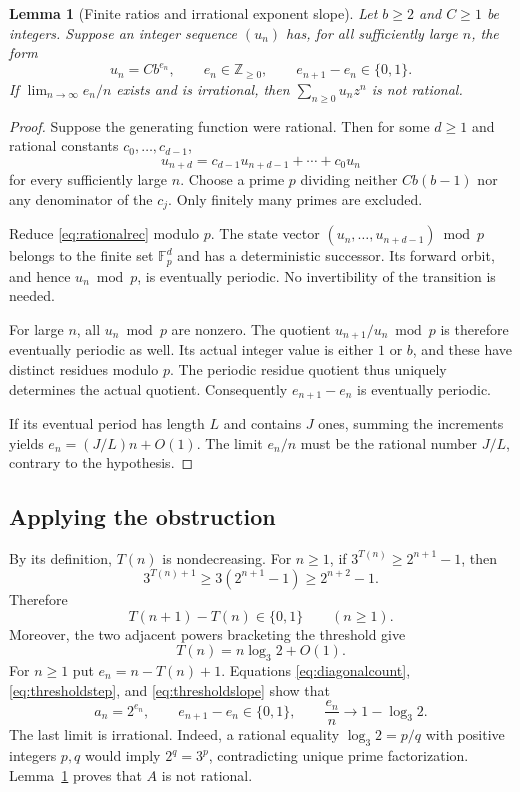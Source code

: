 \documentclass[11pt,letterpaper]{article}
\numberwithin{equation}{section}
\newtheorem{lemma}[theorem]{Lemma}
\theoremstyle{definition}
\theoremstyle{remark}
\newcommand{\Z}{\mathbb{Z}}
\newcommand{\F}{\mathbb{F}}
\begin{document}
\begin{lemma}[Finite ratios and irrational exponent slope]\label{lem:finitefield}
Let $b\ge2$ and $C\ge1$ be integers. Suppose an integer sequence $(u_n)$
has, for all sufficiently large $n$, the form
\[
 u_n=C b^{e_n},\qquad e_n\in\Z_{\ge0},\qquad e_{n+1}-e_n\in\{0,1\}.
\]
If $\lim_{n\to\infty}e_n/n$ exists and is irrational, then
$\sum_{n\ge0}u_nz^n$ is not rational.
\end{lemma}
\begin{proof}
Suppose the generating function were rational. Then for some $d\ge1$
and rational constants $c_0,\ldots,c_{d-1}$,
\begin{equation}\label{eq:rationalrec}
 u_{n+d}=c_{d-1}u_{n+d-1}+\cdots+c_0u_n
\end{equation}
for every sufficiently large $n$. Choose a prime $p$ dividing neither
$Cb(b-1)$ nor any denominator of the $c_j$. Only finitely many primes
are excluded.

Reduce \eqref{eq:rationalrec} modulo $p$. The state vector
$(u_n,\ldots,u_{n+d-1})\bmod p$ belongs to the finite set $\F_p^d$ and
has a deterministic successor. Its forward orbit, and hence $u_n\bmod p$,
is eventually periodic. No invertibility of the transition is needed.

For large $n$, all $u_n\bmod p$ are nonzero. The quotient
$u_{n+1}/u_n\bmod p$ is therefore eventually periodic as well. Its actual
integer value is either $1$ or $b$, and these have distinct residues modulo
$p$. The periodic residue quotient thus uniquely determines the actual
quotient. Consequently $e_{n+1}-e_n$ is eventually periodic.

If its eventual period has length $L$ and contains $J$ ones, summing the
increments yields $e_n=(J/L)n+O(1)$. The limit $e_n/n$ must be the rational
number $J/L$, contrary to the hypothesis.
\end{proof}

\subsection{Applying the obstruction}
By its definition, $T(n)$ is nondecreasing. For $n\ge1$, if
$3^{T(n)}\ge2^{n+1}-1$, then
\[
 3^{T(n)+1}\ge3(2^{n+1}-1)\ge2^{n+2}-1.
\]
Therefore
\begin{equation}\label{eq:thresholdstep}
 T(n+1)-T(n)\in\{0,1\}\qquad(n\ge1).
\end{equation}
Moreover, the two adjacent powers bracketing the threshold give
\begin{equation}\label{eq:thresholdslope}
 T(n)=n\log_3 2+O(1).
\end{equation}
For $n\ge1$ put $e_n=n-T(n)+1$. Equations
\eqref{eq:diagonalcount}, \eqref{eq:thresholdstep}, and
\eqref{eq:thresholdslope} show that
\[
 a_n=2^{e_n},\qquad e_{n+1}-e_n\in\{0,1\},\qquad
 \frac{e_n}{n}\longrightarrow1-\log_3 2.
\]
The last limit is irrational. Indeed, a rational equality
$\log_3 2=p/q$ with positive integers $p,q$ would imply
$2^q=3^p$, contradicting unique prime factorization. Lemma~\ref{lem:finitefield}
proves that $A$ is not rational.
\end{document}
